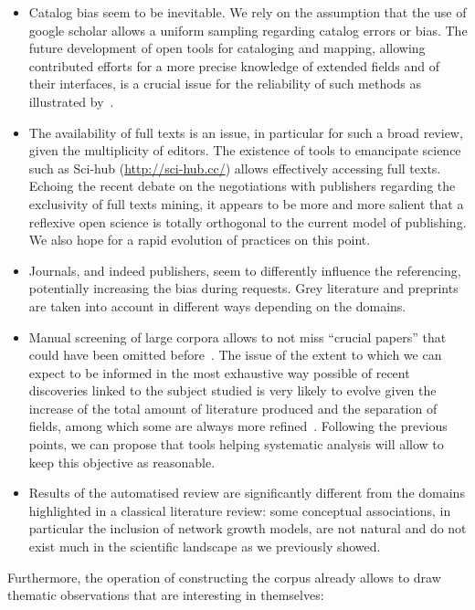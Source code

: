 \documentclass[10pt]{article}
\begin{document}
\begin{itemize}
	\item Catalog bias seem to be inevitable. We rely on the assumption that the use of google scholar allows a uniform sampling regarding catalog errors or bias. The future development of open tools for cataloging and mapping, allowing contributed efforts for a more precise knowledge of extended fields and of their interfaces, is a crucial issue for the reliability of such methods as illustrated by~\cite{raimbault2019empowering}.
	\item The availability of full texts is an issue, in particular for such a broad review, given the multiplicity of editors. The existence of tools to emancipate science such as Sci-hub (\url{http://sci-hub.cc/}) allows effectively accessing full texts. Echoing the recent debate on the negotiations with publishers regarding the exclusivity of full texts mining, it appears to be more and more salient that a reflexive open science is totally orthogonal to the current model of publishing. We also hope for a rapid evolution of practices on this point.
	\item Journals, and indeed publishers, seem to differently influence the referencing, potentially increasing the bias during requests. Grey literature and preprints are taken into account in different ways depending on the domains.
	\item Manual screening of large corpora allows to not miss ``crucial papers'' that could have been omitted before~\cite{lissack2013subliminal}. The issue of the extent to which we can expect to be informed in the most exhaustive way possible of recent discoveries linked to the subject studied is very likely to evolve given the increase of the total amount of literature produced and the separation of fields, among which some are always more refined~\cite{bastian2010seventy}. Following the previous points, we can propose that tools helping systematic analysis will allow to keep this objective as reasonable.
	\item Results of the automatised review are significantly different from the domains highlighted in a classical literature review: some conceptual associations, in particular the inclusion of network growth models, are not natural and do not exist much in the scientific landscape as we previously showed.
\end{itemize}

Furthermore, the operation of constructing the corpus already allows to draw thematic observations that are interesting in themselves:
\end{document}
